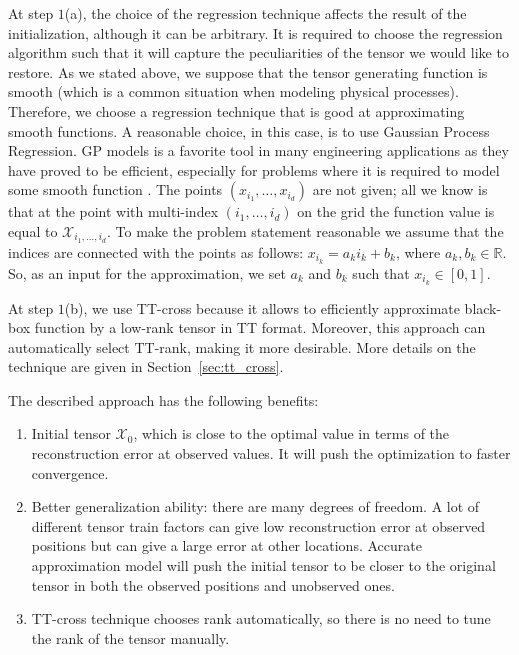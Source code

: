 At step $1$(a), the choice of the regression technique affects
the result of the initialization, although it can be arbitrary.
It is required to choose the regression algorithm such that it will capture the peculiarities of the tensor we would like to restore.
As we stated above, we suppose that the tensor generating function is smooth
(which is a common situation when modeling physical processes).
Therefore, we choose a regression technique that is good at approximating smooth functions.
A reasonable choice, in this case, is to use Gaussian Process Regression.
GP models is a favorite tool in many engineering applications as they have
proved to be efficient, especially for problems where it is required to
model some smooth function \citep{belyaev2016gtapprox}.
The points $(x_{i_1}, \ldots, x_{i_d})$ are not given; all we know is that at the point with multi-index
$(i_1, \ldots, i_d)$ on the grid the function value
is equal to $\mathcal{X}_{i_1, \ldots, i_d}$.
To make the problem statement reasonable we assume that
the indices are connected with the points as follows:
$x_{i_k} = a_k i_k + b_k$,
where $a_k, b_k \in \mathbb{R}$.
So, as an input for the approximation, we set $a_k$ and $b_k$ such that $x_{i_k} \in [0, 1]$.

At step $1$(b), we use TT-cross
because it allows to efficiently approximate black-box function by a low-rank tensor in TT format.
Moreover, this approach can automatically select TT-rank, making it more desirable.
More details on the technique are given in Section~\ref{sec:tt_cross}.

The described approach has the following benefits:
\begin{enumerate}
    \item Initial tensor $\mathcal{X}_0$, which is close to the optimal value in terms of the reconstruction error at observed values.
    It will push the optimization to faster convergence.
    \item Better generalization ability: there are many degrees of freedom. A lot of different tensor train factors can give low reconstruction error at observed positions but can give a large error at other locations.
    Accurate approximation model will push the initial tensor to be closer to the original tensor in both the observed positions and unobserved ones.
    \item TT-cross technique chooses rank automatically, so there is no need to tune the rank of the tensor manually.
\end{enumerate}

